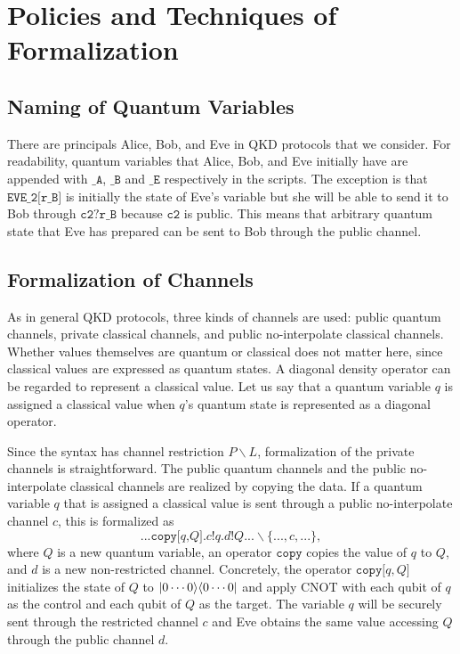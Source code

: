 \section{Policies and Techniques of Formalization}
\label{fml:policiesandtechs}
\subsection*{Naming of Quantum Variables}
There are principals Alice, Bob, and Eve in QKD protocols that we
consider.
For readability, quantum variables that Alice, Bob, and Eve initially
have are appended with $\texttt{\_A}$, $\texttt{\_B}$ and
$\texttt{\_E}$ respectively in the scripts.
The exception is that $\texttt{EVE\_2[r\_B]}$ is 
initially the state of Eve's variable but she will be able to
send it to Bob through $\texttt{c2?r\_B}$ because $\texttt{c2}$ is
public. This means that arbitrary quantum state that
Eve has prepared can be sent to Bob through the public channel.

\subsection*{Formalization of Channels}
As in general QKD protocols, three kinds of channels are used:
public quantum channels, private classical channels, and public
no-interpolate
classical channels.
Whether values
themselves are quantum or classical does not matter here, since
classical values are expressed as quantum states.
A diagonal density operator can be regarded to represent a 
classical value. Let us say that a quantum variable $q$ is assigned
a classical value when $q$'s quantum state is represented as a 
diagonal operator.

Since the syntax has channel restriction $P \backslash L$,
formalization of the private channels is straightforward.
The public quantum channels and the public
no-interpolate classical channels are realized by copying
the data.
If a quantum variable $q$ that is assigned a classical value
is sent through a public no-interpolate channel $c$, this is 
formalized as
\[
...\texttt{copy[}q\texttt{,}Q\texttt{].}c\texttt{!}q\texttt{.}d\texttt{!}Q...\backslash
\{...,c,...\},
\]
where $Q$ is a new quantum variable, an operator $\texttt{copy}$ 
copies the value of $q$ to $Q$, and $d$
is a new non-restricted channel. Concretely, the operator
$\texttt{copy[}q,Q\texttt{]}$ initializes the state of $Q$ to
$|0 \cdots 0\rangle\langle 0 \cdots 0|$ and apply CNOT with each
qubit of $q$ as the control and each qubit of $Q$ as the target.
The variable $q$ will be securely 
sent through the restricted channel $c$ and Eve
obtains the same value accessing $Q$ through the public channel
$d$. 

